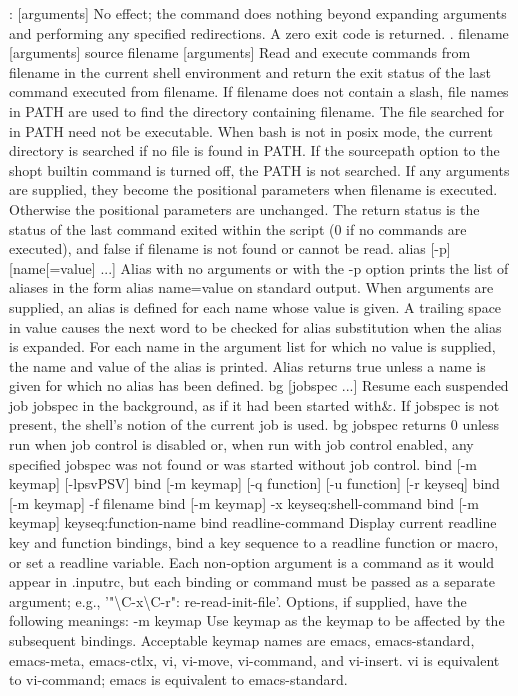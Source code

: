 \begin{longtable}
: [arguments]
No effect; the command does nothing beyond expanding arguments and performing any specified redirections. A zero exit code is returned.
. filename [arguments]
source filename [arguments]
Read and execute commands from filename in the current shell environment and return the exit status of the last command executed from filename. If filename does not contain a slash, file names in PATH are used to find the directory containing filename. The file searched for in PATH need not be executable. When bash is not in posix mode, the current directory is searched if no file is found in PATH. If the sourcepath option to the shopt builtin command is turned off, the PATH is not searched. If any arguments are supplied, they become the positional parameters when filename is executed. Otherwise the positional parameters are unchanged. The return status is the status of the last command exited within the script (0 if no commands are executed), and false if filename is not found or cannot be read.
alias [-p] [name[=value] ...]
Alias with no arguments or with the -p option prints the list of aliases in the form alias name=value on standard output. When arguments are supplied, an alias is defined for each name whose value is given. A trailing space in value causes the next word to be checked for alias substitution when the alias is expanded. For each name in the argument list for which no value is supplied, the name and value of the alias is printed. Alias returns true unless a name is given for which no alias has been defined.
bg [jobspec ...]
Resume each suspended job jobspec in the background, as if it had been started with\&. If jobspec is not present, the shell's notion of the current job is used. bg jobspec returns 0 unless run when job control is disabled or, when run with job control enabled, any specified jobspec was not found or was started without job control.
bind [-m keymap] [-lpsvPSV]
bind [-m keymap] [-q function] [-u function] [-r keyseq]
bind [-m keymap] -f filename
bind [-m keymap] -x keyseq:shell-command
bind [-m keymap] keyseq:function-name
bind readline-command
Display current readline key and function bindings, bind a key sequence to a readline function or macro, or set a readline variable. Each non-option argument is a command as it would appear in .inputrc, but each binding or command must be passed as a separate argument; e.g., '"\textbackslash C-x\textbackslash C-r": re-read-init-file'. Options, if supplied, have the following meanings:
-m keymap
Use keymap as the keymap to be affected by the subsequent bindings. Acceptable keymap names are emacs, emacs-standard, emacs-meta, emacs-ctlx, vi, vi-move, vi-command, and vi-insert. vi is equivalent to vi-command; emacs is equivalent to emacs-standard.


\end{longtable}
